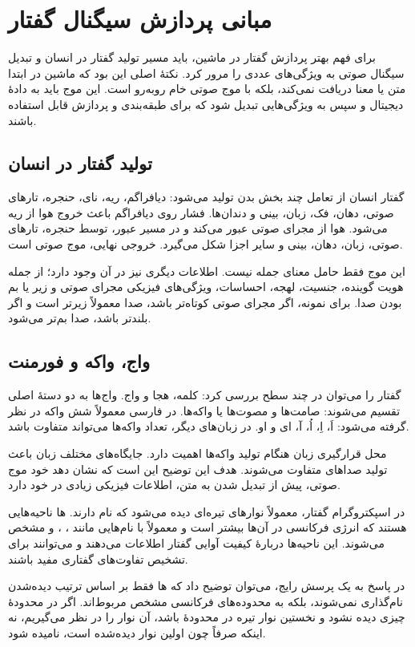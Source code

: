 \section{مبانی پردازش سیگنال گفتار}
برای فهم بهتر پردازش گفتار در ماشین، باید مسیر تولید گفتار در انسان و تبدیل سیگنال صوتی به ویژگی‌های عددی را مرور کرد. نکتهٔ اصلی این بود که ماشین در ابتدا متن یا معنا دریافت نمی‌کند، بلکه با موج صوتی خام روبه‌رو است. این موج باید به دادهٔ دیجیتال و سپس به ویژگی‌هایی تبدیل شود که برای طبقه‌بندی و پردازش قابل استفاده باشند.

\subsection{تولید گفتار در انسان}
گفتار انسان از تعامل چند بخش بدن تولید می‌شود: دیافراگم، ریه، نای، حنجره، تارهای صوتی، دهان، فک، زبان، بینی و دندان‌ها. فشار روی دیافراگم باعث خروج هوا از ریه می‌شود. هوا از مجرای صوتی عبور می‌کند و در مسیر عبور، توسط حنجره، تارهای صوتی، زبان، دهان، بینی و سایر اجزا شکل می‌گیرد. خروجی نهایی، موج صوتی است.

این موج فقط حامل معنای جمله نیست. اطلاعات دیگری نیز در آن وجود دارد؛ از جمله هویت گوینده، جنسیت، لهجه، احساسات، ویژگی‌های فیزیکی مجرای صوتی و زیر یا بم بودن صدا. برای نمونه، اگر مجرای صوتی کوتاه‌تر باشد، صدا معمولاً زیرتر است و اگر بلندتر باشد، صدا بم‌تر می‌شود.

\subsection{واج، واکه و فورمنت}
گفتار را می‌توان در چند سطح بررسی کرد: کلمه، هجا و واج. واج‌ها به دو دستهٔ اصلی تقسیم می‌شوند: صامت‌ها و مصوت‌ها یا واکه‌ها. در فارسی معمولاً شش واکه در نظر گرفته می‌شود: اَ، اِ، اُ، آ، ای و او. در زبان‌های دیگر، تعداد واکه‌ها می‌تواند متفاوت باشد.

محل قرارگیری زبان هنگام تولید واکه‌ها اهمیت دارد. جایگاه‌های مختلف زبان باعث تولید صداهای متفاوت می‌شوند. هدف این توضیح این است که نشان دهد خود موج صوتی، پیش از تبدیل شدن به متن، اطلاعات فیزیکی زیادی در خود دارد.

در اسپکتروگرام گفتار، معمولاً نوارهای تیره‌ای دیده می‌شود که  نام دارند. ها ناحیه‌هایی هستند که انرژی فرکانسی در آن‌ها بیشتر است و معمولاً با نام‌هایی مانند ، ،  و  مشخص می‌شوند. این ناحیه‌ها دربارهٔ کیفیت آوایی گفتار اطلاعات می‌دهند و می‌توانند برای تشخیص تفاوت‌های گفتاری مفید باشند.

در پاسخ به یک پرسش رایج، می‌توان توضیح داد که ها فقط بر اساس ترتیب دیده‌شدن نام‌گذاری نمی‌شوند، بلکه به محدوده‌های فرکانسی مشخص مربوط‌اند. اگر در محدودهٔ  چیزی دیده نشود و نخستین نوار تیره در محدودهٔ  باشد، آن نوار را  در نظر می‌گیریم، نه اینکه صرفاً چون اولین نوار دیده‌شده است،  نامیده شود.

